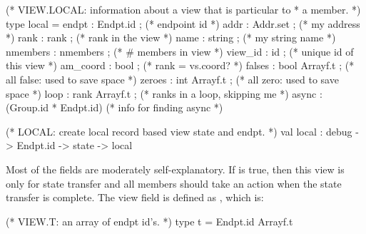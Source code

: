 \begin{codebox}
(* VIEW.LOCAL: information about a view that is particular to 
 * a member.
 *)
type local = {
  endpt	        : Endpt.id ;		(* endpoint id *)
  addr	        : Addr.set ;		(* my address *)
  rank 	        : rank ;		(* rank in the view *)  
  name		: string ;		(* my string name *)
  nmembers 	: nmembers ;		(* # members in view *)
  view_id 	: id ;			(* unique id of this view *)
  am_coord      : bool ;  		(* rank = vs.coord? *)
  falses        : bool Arrayf.t ;       (* all false: used to save space *)
  zeroes        : int Arrayf.t ;        (* all zero: used to save space *)
  loop          : rank Arrayf.t ;      	(* ranks in a loop, skipping me *)
  async         : (Group.id * Endpt.id) (* info for finding async *)
}  

(* LOCAL: create local record based view state and endpt.
 *)
val local : debug -> Endpt.id -> state -> local
\end{codebox}

Most of the fields are moderately self-explanatory.  If
 is true, then this view is only for state transfer
and all members should take an  action when the state
transfer is complete.  The view field is defined as ,
which is:
\begin{codebox}
(* VIEW.T: an array of endpt id's.
 *)
type t = Endpt.id Arrayf.t
\end{codebox}
